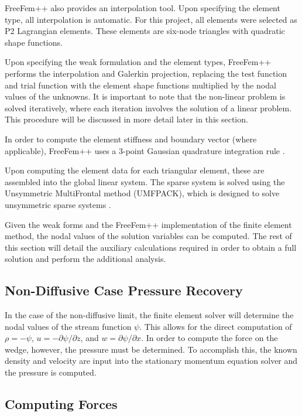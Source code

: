 \documentclass[12pt]{article}
\begin{document}
\textsf{FreeFem++} also provides an interpolation tool. Upon specifying the element type, all interpolation is automatic. For this project, all elements were selected as P2 Lagrangian elements. These elements are six-node triangles with quadratic shape functions.

Upon specifying the weak formulation and the element types, \textsf{FreeFem++} performs the interpolation and Galerkin projection, replacing the test function and trial function with the element shape functions multiplied by the nodal values of the unknowns. It is important to note that the non-linear problem is solved iteratively, where each iteration involves the solution of a linear problem. This procedure will be discussed in more detail later in this section.

In order to compute the element stiffness and boundary vector (where applicable), \textsf{FreeFem++} uses a 3-point Gaussian quadrature integration rule \cite{hecht2018freefem++}.

Upon computing the element data for each triangular element, these are assembled into the global linear system. The sparse system is solved using the Unsymmetric MultiFrontal method (UMFPACK), which is designed to solve unsymmetric sparse systems \cite{UMFPACK}.

Given the weak forms and the \textsf{FreeFem++} implementation of the finite element method, the nodal values of the solution variables can be computed. The rest of this section will detail the auxiliary calculations required in order to obtain a full solution and perform the additional analysis.

\subsection{Non-Diffusive Case Pressure Recovery}

In the case of the non-diffusive limit, the finite element solver will determine the nodal values of the stream function $\psi$. This allows for the direct computation of $\rho=-\psi$, $u = -\partial\psi/\partial z$, and $w = \partial\psi/\partial x$. In order to compute the force on the wedge, however, the pressure must be determined. To accomplish this, the known density and velocity are input into the stationary momentum equation solver and the pressure is computed.

\subsection{Computing Forces}
\end{document}
